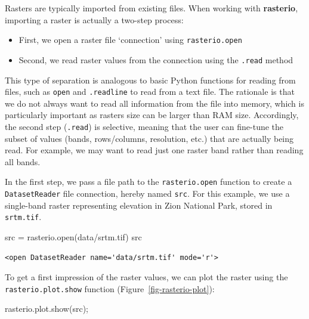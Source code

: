 \documentclass[
  letterpaper,
]{krantz}
\newenvironment{Shaded}{\begin{snugshade}}{\end{snugshade}}
\newcommand{\BuiltInTok}[1]{\textcolor[rgb]{0.00,0.23,0.31}{#1}}
\newcommand{\NormalTok}[1]{\textcolor[rgb]{0.00,0.23,0.31}{#1}}
\newcommand{\OperatorTok}[1]{\textcolor[rgb]{0.37,0.37,0.37}{#1}}
\newcommand{\StringTok}[1]{\textcolor[rgb]{0.13,0.47,0.30}{#1}}
\providecommand{\tightlist}{%
  \setlength{\itemsep}{0pt}\setlength{\parskip}{0pt}}\usepackage{longtable,booktabs,array}
\begin{document}
Rasters are typically imported from existing files. When working with
\textbf{rasterio}, importing a raster is actually a two-step process:

\begin{itemize}
\tightlist
\item
  First, we open a raster file `connection' using \texttt{rasterio.open}
\item
  Second, we read raster values from the connection using the
  \texttt{.read} method
\end{itemize}

This type of separation is analogous to basic Python functions for
reading from files, such as \texttt{open} and \texttt{.readline} to read
from a text file. The rationale is that we do not always want to read
all information from the file into memory, which is particularly
important as rasters size can be larger than RAM size. Accordingly, the
second step (\texttt{.read}) is selective, meaning that the user can
fine-tune the subset of values (bands, rows/columns, resolution, etc.)
that are actually being read. For example, we may want to read just one
raster band rather than reading all bands.

In the first step, we pass a file path to the \texttt{rasterio.open}
function to create a \texttt{DatasetReader} file connection, hereby
named \texttt{src}. For this example, we use a single-band raster
representing elevation in Zion National Park, stored in
\texttt{srtm.tif}.

\begin{Shaded}
\begin{Highlighting}[]
\NormalTok{src }\OperatorTok{=}\NormalTok{ rasterio.}\BuiltInTok{open}\NormalTok{(}\StringTok{\textquotesingle{}data/srtm.tif\textquotesingle{}}\NormalTok{)}
\NormalTok{src}
\end{Highlighting}
\end{Shaded}

\begin{verbatim}
<open DatasetReader name='data/srtm.tif' mode='r'>
\end{verbatim}

To get a first impression of the raster values, we can plot the raster
using the \texttt{rasterio.plot.show} function
(Figure~\ref{fig-rasterio-plot}):

\begin{Shaded}
\begin{Highlighting}[]
\NormalTok{rasterio.plot.show(src)}\OperatorTok{;}
\end{Highlighting}
\end{Shaded}
\end{document}
